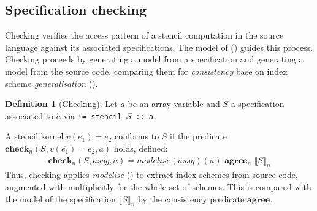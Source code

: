 \documentclass[10pt,preprint,numbers]{sigplanconf}
\newcounter{block}
\theoremstyle{definition}
\newtheorem{definition}[block]{Definition}
\newcommand{\interp}[1]{\llbracket{#1}\rrbracket}
\newcommand{\consAName}{\textbf{agree}}
\newcommand{\consSub}[3]{#2 \,\, \consAName{}_{#1} \,\,#3}
\begin{document}
%

\subsection{Specification checking}
\label{subsec:checking}

Checking verifies the access pattern of a stencil computation in the
source language against its associated specifications. The model of
() guides this process.  Checking
proceeds by generating a model from a specification and generating
a model from the source code, comparing them for
\emph{consistency} base on index scheme
\emph{generalisation} ().

\begin{definition}[Checking]
Let $a$ be an array variable and
$S$ a specification associated to $a$
via \texttt{!= stencil $S$ :: a}.

A stencil kernel
 $v(\overline{e_1}) = e_2$
conforms to $S$ if the predicate $\textbf{check}_n(S, v(\overline{e_1}) = e_2, a)$ holds,
defined:
\begin{align*}
& \textbf{check}_n(S, \textit{assg}, a) =
  \consSub{n}{\textit{modelise}(\textit{assg})(a)}{\interp{S}_n}
&
\end{align*}
Thus, checking applies \textit{modelise}
() to extract index schemes from source code,
augmented with multiplicitly for the whole set of schemes.
This is compared with the model of the specification $\interp{S}_n$ by
the consistency predicate $\consAName$.
\end{definition}
\end{document}
